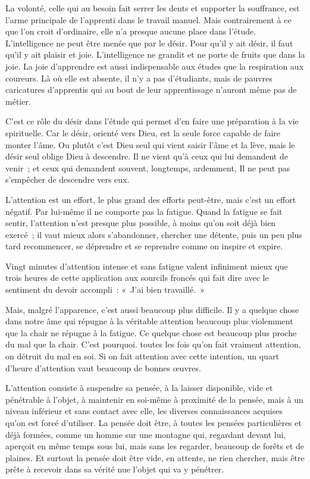 \documentclass[french,twoside]{book} %
\begin{document}
La volonté, celle qui au besoin fait serrer les dents et supporter la souffrance, est l'arme principale de l'apprenti dans le travail manuel. Mais contrairement à ce que l'on croit d'ordinaire, elle n'a presque aucune place dans l'étude. L'intelligence ne peut être menée que par le désir. Pour qu'il y ait désir, il faut qu'il y ait plaisir et joie. L'intelligence ne grandit et ne porte de fruits que dans la joie. La joie d'apprendre est aussi indispensable aux études que la respiration aux coureurs. Là où elle est absente, il n'y a pas d'étudiants, mais de pauvres caricatures d'apprentis qui au bout de leur apprentissage n'auront même pas de métier.\par
C'est ce rôle du désir dans l'étude qui permet d'en faire une préparation à la vie spirituelle. Car le désir, orienté vers Dieu, est la seule force capable de faire monter l'âme. Ou plutôt c'est Dieu seul qui vient saisir l'âme et la lève, mais le désir seul oblige Dieu à descendre. Il ne vient qu'à ceux qui lui demandent de venir ; et ceux qui demandent souvent, longtemps, ardemment, Il ne peut pas s'empêcher de descendre vers eux.\par
L'attention est un effort, le plus grand des efforts peut-être, mais c'est un effort négatif. Par lui-même il ne comporte pas la fatigue. Quand la fatigue se fait sentir, l'attention n'est presque plus possible, à moins qu'on soit déjà bien exercé ; il vaut mieux alors s'abandonner, chercher une détente, puis un peu plus tard recommencer, se déprendre et se reprendre comme on inspire et expire.\par
Vingt minutes d'attention intense et sans fatigue valent infiniment mieux que trois heures de cette application aux sourcils froncés qui fait dire avec le sentiment du devoir accompli : « J'ai bien travaillé. »\par
Mais, malgré l'apparence, c'est aussi beaucoup plus difficile. Il y a quelque chose dans notre âme qui répugne à la véritable attention beaucoup plus violemment que la chair ne répugne à la fatigue. Ce quelque chose est beaucoup plus proche du mal que la chair. C'est pourquoi. toutes les fois qu'on fait vraiment attention, on détruit du mal en soi. Si on fait attention avec cette intention, un quart d'heure d'attention vaut beaucoup de bonnes œuvres.\par
L'attention consiste à suspendre sa pensée, à la laisser disponible, vide et pénétrable à l'objet, à maintenir en soi-même à proximité de la pensée, mais à un niveau inférieur et sans contact avec elle, les diverses connaissances acquises qu'on est forcé d'utiliser. La pensée doit être, à toutes les pensées particulières et déjà formées, comme un homme sur une montagne qui, regardant devant lui, aperçoit en même temps sous lui, mais sans les regarder, beaucoup de forêts et de plaines. Et surtout la pensée doit être vide, en attente, ne rien chercher, mais être prête à recevoir dans sa vérité nue l'objet qui va y pénétrer.\par
\end{document}
